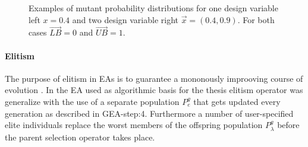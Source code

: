 \begin{figure}[h!]
\begin{minipage}[b]{0.5\linewidth}
 \centering
\end{minipage}
\begin{minipage}[b]{0.5\linewidth}
 \centering
\end{minipage}
\label{realmut}
\caption{Examples of mutant probability distributions for one design variable left $x=0.4$ and two design variable right $\vec{x}=(0.4,0.9)$. For both cases $\vec{LB}=0$ and $\vec{UB}=1$.}
\end{figure}

\paragraph{Elitism}
The purpose of elitism in EAs is to guarantee a mononously improoving course of evolution \cite{Back1996}. In the EA used as algorithmic basis for the thesis elitism operator was generalize with the use of a separate population $P_e^g$ that gets updated every generation as described in GEA-step:4. Furthermore a number of user-specified elite individuals replace the worst members of the offspring population $P^g_{\lambda}$ before the parent selection operator takes place.
  


